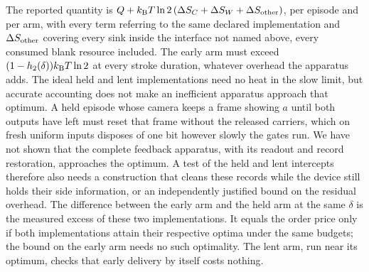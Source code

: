 The reported quantity is $Q+k_{\mathrm B} T\ln2\,(\Delta S_C+\Delta S_W+\Delta S_{\rm other})$, per episode and per arm, with every term referring to the same declared implementation and $\Delta S_{\rm other}$ covering every sink inside the interface not named above, every consumed blank resource included. The early arm must exceed $(1-h_2(\delta))k_{\mathrm B} T\ln2$ at every stroke duration, whatever overhead the apparatus adds. The ideal held and lent implementations need no heat in the slow limit, but accurate accounting does not make an inefficient apparatus approach that optimum. A held episode whose camera keeps a frame showing $a$ until both outputs have left must reset that frame without the released carriers, which on fresh uniform inputs disposes of one bit however slowly the gates run. We have not shown that the complete feedback apparatus, with its readout and record restoration, approaches the optimum. A test of the held and lent intercepts therefore also needs a construction that cleans these records while the device still holds their side information, or an independently justified bound on the residual overhead. The difference between the early arm and the held arm at the same $\delta$ is the measured excess of these two implementations. It equals the order price only if both implementations attain their respective optima under the same budgets; the bound on the early arm needs no such optimality. The lent arm, run near its optimum, checks that early delivery by itself costs nothing.

